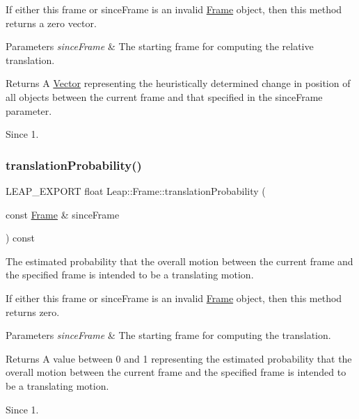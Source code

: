 If either this frame or since\+Frame is an invalid \hyperlink{class_leap_1_1_frame}{Frame} object, then this method returns a zero vector.


\begin{DoxyParams}{Parameters}
{\em since\+Frame} & The starting frame for computing the relative translation. \\
\hline
\end{DoxyParams}
\begin{DoxyReturn}{Returns}
A \hyperlink{struct_leap_1_1_vector}{Vector} representing the heuristically determined change in position of all objects between the current frame and that specified in the since\+Frame parameter. 
\end{DoxyReturn}
\begin{DoxySince}{Since}
1. 
\end{DoxySince}
\mbox{\label{class_leap_1_1_frame_a1b13d75fc19b390ad742013fb07eeb1b}} 
\subsubsection{\texorpdfstring{translation\+Probability()}{translationProbability()}}
{\footnotesize\ttfamily L\+E\+A\+P\+\_\+\+E\+X\+P\+O\+RT float Leap\+::\+Frame\+::translation\+Probability (\begin{DoxyParamCaption}\item[{const \hyperlink{class_leap_1_1_frame}{Frame} \&}]{since\+Frame }\end{DoxyParamCaption}) const}

The estimated probability that the overall motion between the current frame and the specified frame is intended to be a translating motion.


\begin{DoxyCodeInclude}
\end{DoxyCodeInclude}


If either this frame or since\+Frame is an invalid \hyperlink{class_leap_1_1_frame}{Frame} object, then this method returns zero.


\begin{DoxyParams}{Parameters}
{\em since\+Frame} & The starting frame for computing the translation. \\
\hline
\end{DoxyParams}
\begin{DoxyReturn}{Returns}
A value between 0 and 1 representing the estimated probability that the overall motion between the current frame and the specified frame is intended to be a translating motion. 
\end{DoxyReturn}
\begin{DoxySince}{Since}
1. 
\end{DoxySince}


